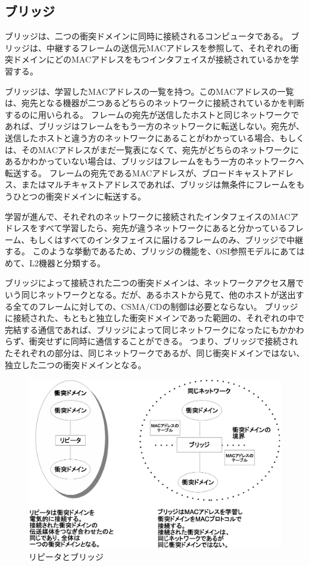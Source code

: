 \subsection{ブリッジ}

ブリッジは、二つの衝突ドメインに同時に接続されるコンピュータである。
ブリッジは、中継するフレームの送信元MACアドレスを参照して、それぞれの衝突ドメインにどのMACアドレスをもつインタフェイスが接続されているかを学習する。

ブリッジは、学習したMACアドレスの一覧を持つ。このMACアドレスの一覧は、宛先となる機器が二つあるどちらのネットワークに接続されているかを判断するのに用いられる。
フレームの宛先が送信したホストと同じネットワークであれば、ブリッジはフレームをもう一方のネットワークに転送しない。宛先が、送信したホストと違う方のネットワークにあることがわかっている場合、もしくは、そのMACアドレスがまだ一覧表になくて、宛先がどちらのネットワークにあるかわかっていない場合は、ブリッジはフレームをもう一方のネットワークへ転送する。
フレームの宛先であるMACアドレスが、ブロードキャストアドレス、またはマルチキャストアドレスであれば、ブリッジは無条件にフレームをもうひとつの衝突ドメインに転送する。

学習が進んで、それぞれのネットワークに接続されたインタフェイスのMACアドレスをすべて学習したら、宛先が違うネットワークにあると分かっているフレーム、もしくはすべてのインタフェイスに届けるフレームのみ、ブリッジで中継する。
このような挙動であるため、ブリッジの機能を、OSI参照モデルにあてはめて、L2機器と分類する。

ブリッジによって接続された二つの衝突ドメインは、ネットワークアクセス層でいう同じネットワークとなる。だが、あるホストから見て、他のホストが送出する全てのフレームに対しての、CSMA/CDの制御は必要とならない。
ブリッジに接続された、もともと独立した衝突ドメインであった範囲の、それぞれの中で完結する通信であれば、ブリッジによって同じネットワークになったにもかかわらず、衝突せずに同時に通信することができる。
つまり、ブリッジで接続されたそれぞれの部分は、同じネットワークであるが、同じ衝突ドメインではない、独立した二つの衝突ドメインとなる。

\begin{figure}[htbp]
	\includegraphics[width=12cm,clip]{draw/repeaterbridge.eps}
	\caption{リピータとブリッジ}
	\label{fig:repeaterbridge}
\end{figure}

